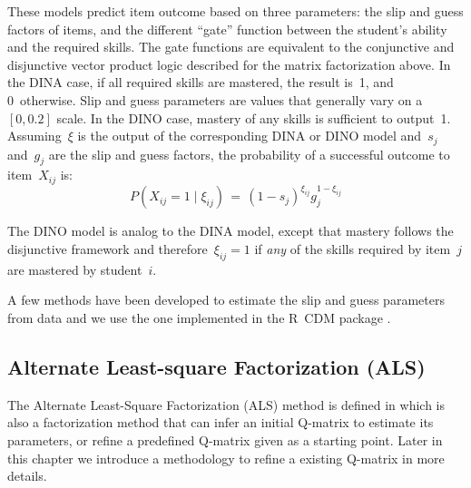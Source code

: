 These models predict item outcome based on three parameters: the slip and guess factors of items, and the different ``gate'' function between the student's ability and the required skills.  The gate functions are equivalent to the conjunctive and disjunctive vector product logic described for the matrix factorization above.  In the DINA case, if all required skills are mastered, the result is~1, and 0~otherwise. Slip and guess parameters are values that generally vary on a~$[0,0.2]$ scale. In the DINO case, mastery of any skills is sufficient to output~1.  Assuming~$\xi$ is the output of the corresponding DINA or DINO model and~$s_j$ and~$g_j$ are the slip and guess factors, the probability of a successful outcome to item~$X_{ij}$ is:
\begin{equation}
 P(X_{ij} \!=\! 1 \; | \; \xi_{ij}) \,=\, (1-s_j)^{\xi_{ij}} g_j^{1-\xi_{ij}}
\label{DinoEQ}
\end{equation}

The DINO model is analog to the DINA model, except that mastery follows the disjunctive framework and therefore~$\xi_{ij}=1$ if \textit{any} of the skills required by item~$j$ are mastered by student~$i$.

A few methods have been developed to estimate the slip and guess parameters from data and we use the one implemented in the R~CDM package \citep{Robitzsch2012}.

\subsection{Alternate Least-square Factorization (ALS)}
\label{ALS-Def}


The {Alternate Least-Square Factorization (ALS)} method is defined in \cite{Desmarais2013aied} which is also a factorization method that can infer an initial Q-matrix to estimate its parameters, or refine a predefined Q-matrix given as a starting point. Later in this chapter we introduce a methodology to refine a existing Q-matrix in more details.


